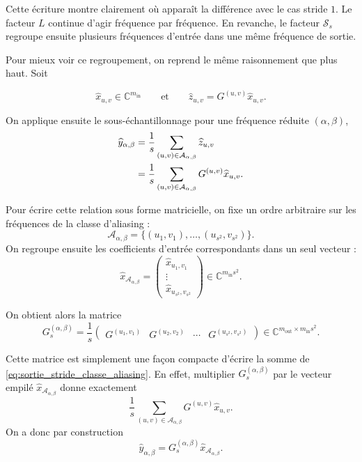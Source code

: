 Cette écriture montre clairement où apparaît la différence avec le cas stride $1$. Le facteur $L$
continue d'agir fréquence par fréquence. En revanche, le facteur $\mathcal{S}_s$ regroupe ensuite
plusieurs fréquences d'entrée dans une même fréquence de sortie.

Pour mieux voir ce regroupement, on reprend le même raisonnement que plus haut.
Soit

\begin{equation*}
    \widehat{x}_{u,v} \in \mathbb{C}^{m_{\mathrm{in}}}
    \qquad \text{et} \qquad
    \widehat{z}_{u,v} = G^{(u,v)} \widehat{x}_{u,v}.
\end{equation*}

On applique ensuite le sous-échantillonnage pour une fréquence réduite $(\alpha,\beta)$,
\begin{align}
    \widehat{y}_{\alpha,\beta}
    &=
    \frac{1}{s}
    \sum_{(u,v)\in\mathcal{A}_{\alpha,\beta}}
    \widehat{z}_{u,v} \notag \\
    &=
    \frac{1}{s}
    \sum_{(u,v)\in\mathcal{A}_{\alpha,\beta}}
    G^{(u,v)}\widehat{x}_{u,v}.
    \label{eq:sortie_stride_classe_aliasing}
\end{align}

Pour écrire cette relation sous forme matricielle, on fixe un ordre arbitraire sur les fréquences de
la classe d'aliasing :
\[
    \mathcal{A}_{\alpha,\beta}
    =
    \{(u_1,v_1),\dots,(u_{s^2},v_{s^2})\}.
\]
On regroupe ensuite les coefficients d'entrée correspondants dans un seul vecteur :
\[
    \widehat{x}_{\mathcal{A}_{\alpha,\beta}}
    =
    \begin{pmatrix}
        \widehat{x}_{u_1,v_1} \\
        \vdots \\
        \widehat{x}_{u_{s^2},v_{s^2}}
    \end{pmatrix}
    \in \mathbb{C}^{m_{\mathrm{in}}s^2}.
\]

On obtient alors la matrice
\begin{equation}
    G_s^{(\alpha,\beta)}
    =
    \frac{1}{s}
    \begin{pmatrix}
        G^{(u_1,v_1)}
        &
        G^{(u_2,v_2)}
        &
        \cdots
        &
        G^{(u_{s^2},v_{s^2})}
    \end{pmatrix}
    \in
    \mathbb{C}^{m_{\mathrm{out}}\times m_{\mathrm{in}}s^2}.
    \label{eq:def_matrice_aliasing_stride}
\end{equation}

Cette matrice est simplement une façon compacte d'écrire la somme de
\eqref{eq:sortie_stride_classe_aliasing}. En effet, multiplier
$G_s^{(\alpha,\beta)}$ par le vecteur empilé
$\widehat{x}_{\mathcal{A}_{\alpha,\beta}}$ donne exactement
\[
    \frac{1}{s}
    \sum_{(u,v)\in\mathcal{A}_{\alpha,\beta}}
    G^{(u,v)}\widehat{x}_{u,v}.
\]
On a donc par construction
\begin{equation*}
    \widehat{y}_{\alpha,\beta}
    =
    G_s^{(\alpha,\beta)}
    \widehat{x}_{\mathcal{A}_{\alpha,\beta}}.
\end{equation*}

